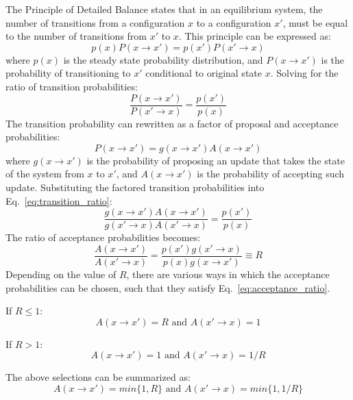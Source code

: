 \documentclass[12pt, two sided]{article}
\begin{document}
The Principle of Detailed Balance states that in an equilibrium system, the number of transitions from a configuration $x$ to a configuration $x'$, must be equal to the number of transitions from $x'$ to $x$. This principle can be expressed as:
%
\begin{equation}
\label{eq:detailed_balance_principle}
p(x)P(x \to x') = p(x') P(x' \to x)
\end{equation}
%
where $p(x)$ is the steady state probability distribution, and $P(x \to x')$ is the probability of transitioning to $x'$ conditional to original state $x$. Solving for the ratio of transition probabilities:
%
\begin{equation}
\label{eq:transition_ratio}
\frac{P(x \to x')}{P(x' \to x)} = \frac{p(x')}{p(x)} 
\end{equation}
%
The transition probability can rewritten as a factor of proposal and acceptance probabilities:
%
\begin{equation}
P(x \to x') = g(x \to x') A(x \to x')
\end{equation}
%
where $g(x \to x')$ is the probability of proposing an update that takes the state of the system from $x$ to $x'$, and $A(x \to x')$ is the probability of accepting such update. Substituting the factored transition probabilities into Eq.~\eqref{eq:transition_ratio}:
%
\begin{equation}
\frac{g(x \to x') A(x \to x')}{ g(x' \to x) A(x' \to x)} = \frac{p(x')}{p(x)} 
\end{equation}
%
The ratio of acceptance probabilities becomes:
%
\begin{equation}
\label{eq:acceptance_ratio}
\frac{A(x \to x')}{A(x' \to x)} = \frac{p(x')g(x' \to x)}{p(x) g(x \to x')} \equiv R
\end{equation}
%
Depending on the value of $R$, there are various ways in which the acceptance probabilities can be chosen, such that they satisfy Eq.~\eqref{eq:acceptance_ratio}.

If $R \leq 1$:
%
\begin{equation} 
A(x \to x' ) = R \text{ and } A(x' \to x) = 1 \nonumber
\end{equation}
%

If $R > 1$: 
\begin{equation}
A(x \to x' ) = 1 \text{ and } A(x' \to x) = 1/R \nonumber
\end{equation}

The above selections can be summarized as:
%
\begin{equation}
\label{eq:general_acceptance_probs}
A(x \to x') = min\{1,R\} \text{ and } A(x' \to x) = min\{1,1/R\}
\end{equation}
%
\end{document}
